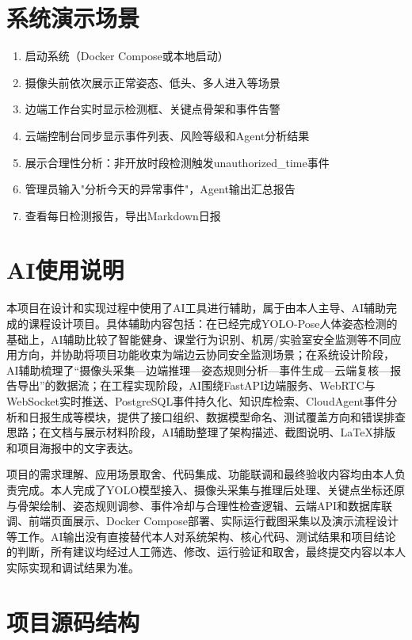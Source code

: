 \newpage
\appendix



\section{系统演示场景}

\begin{enumerate}
\item 启动系统（Docker Compose或本地启动）
\item 摄像头前依次展示正常姿态、低头、多人进入等场景
\item 边端工作台实时显示检测框、关键点骨架和事件告警
\item 云端控制台同步显示事件列表、风险等级和Agent分析结果
\item 展示合理性分析：非开放时段检测触发unauthorized\_time事件
\item 管理员输入"分析今天的异常事件"，Agent输出汇总报告
\item 查看每日检测报告，导出Markdown日报
\end{enumerate}

\section{AI使用说明}

本项目在设计和实现过程中使用了AI工具进行辅助，属于由本人主导、AI辅助完成的课程设计项目。具体辅助内容包括：在已经完成YOLO-Pose人体姿态检测的基础上，AI辅助比较了智能健身、课堂行为识别、机房/实验室安全监测等不同应用方向，并协助将项目功能收束为端边云协同安全监测场景；在系统设计阶段，AI辅助梳理了“摄像头采集---边端推理---姿态规则分析---事件生成---云端复核---报告导出”的数据流；在工程实现阶段，AI围绕FastAPI边端服务、WebRTC与WebSocket实时推送、PostgreSQL事件持久化、知识库检索、CloudAgent事件分析和日报生成等模块，提供了接口组织、数据模型命名、测试覆盖方向和错误排查思路；在文档与展示材料阶段，AI辅助整理了架构描述、截图说明、LaTeX排版和项目海报中的文字表达。

项目的需求理解、应用场景取舍、代码集成、功能联调和最终验收内容均由本人负责完成。本人完成了YOLO模型接入、摄像头采集与推理后处理、关键点坐标还原与骨架绘制、姿态规则调参、事件冷却与合理性检查逻辑、云端API和数据库联调、前端页面展示、Docker Compose部署、实际运行截图采集以及演示流程设计等工作。AI输出没有直接替代本人对系统架构、核心代码、测试结果和项目结论的判断，所有建议均经过人工筛选、修改、运行验证和取舍，最终提交内容以本人实际实现和调试结果为准。

\section{项目源码结构}

